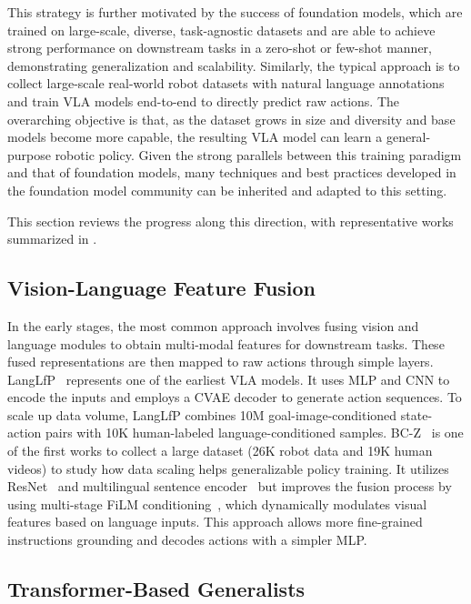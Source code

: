 \documentclass[10pt, a4paper, logo, copyright]{googledeepmind} %
\begin{document}
This strategy is further motivated by the success of foundation models, which are trained on large-scale, diverse, task-agnostic datasets and are able to achieve strong performance on downstream tasks in a zero-shot or few-shot manner, demonstrating generalization and scalability. Similarly, the typical approach is to collect large-scale real-world robot datasets with natural language annotations and train VLA models end-to-end to directly predict raw actions. The overarching objective is that, as the dataset grows in size and diversity and base models become more capable, the resulting VLA model can learn a general-purpose robotic policy. Given the strong parallels between this training paradigm and that of foundation models, many techniques and best practices developed in the foundation model community can be inherited and adapted to this setting.

This section reviews the progress along this direction, with representative works summarized in .



\subsection{Vision-Language Feature Fusion}

In the early stages, the most common approach involves fusing vision and language modules to obtain multi-modal features for downstream tasks. These fused representations are then mapped to raw actions through simple layers. LangLfP~\cite{LangLfP} represents one of the earliest VLA models. It uses MLP and CNN to encode the inputs and employs a CVAE decoder to generate action sequences. To scale up data volume, LangLfP combines 10M goal-image-conditioned state-action pairs with 10K human-labeled language-conditioned samples. BC-Z~\cite{BC-Z} is one of the first works to collect a large dataset (26K robot data and 19K human videos) to study how data scaling helps generalizable policy training. It utilizes ResNet~\cite{he2016deep} and multilingual sentence encoder~\cite{yang2019multilingual} but improves the fusion process by using multi-stage FiLM conditioning~\cite{perez2018film}, which dynamically modulates visual features based on language inputs. This approach allows more fine-grained instructions grounding and decodes actions with a simpler MLP.

\subsection{Transformer-Based Generalists}
\end{document}
